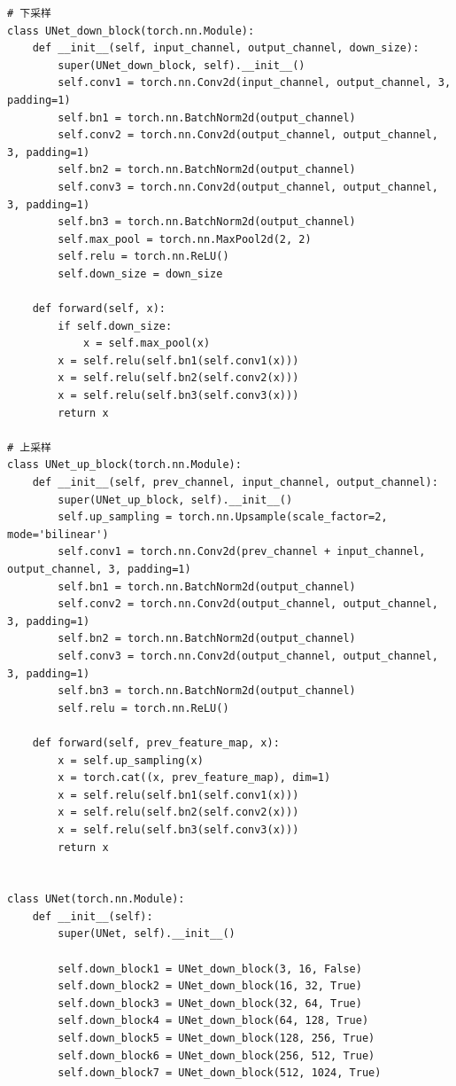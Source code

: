 \begin{lstlisting}
# 下采样
class UNet_down_block(torch.nn.Module):
    def __init__(self, input_channel, output_channel, down_size):
        super(UNet_down_block, self).__init__()
        self.conv1 = torch.nn.Conv2d(input_channel, output_channel, 3, padding=1)
        self.bn1 = torch.nn.BatchNorm2d(output_channel)
        self.conv2 = torch.nn.Conv2d(output_channel, output_channel, 3, padding=1)
        self.bn2 = torch.nn.BatchNorm2d(output_channel)
        self.conv3 = torch.nn.Conv2d(output_channel, output_channel, 3, padding=1)
        self.bn3 = torch.nn.BatchNorm2d(output_channel)
        self.max_pool = torch.nn.MaxPool2d(2, 2)
        self.relu = torch.nn.ReLU()
        self.down_size = down_size

    def forward(self, x):
        if self.down_size:
            x = self.max_pool(x)
        x = self.relu(self.bn1(self.conv1(x)))
        x = self.relu(self.bn2(self.conv2(x)))
        x = self.relu(self.bn3(self.conv3(x)))
        return x

# 上采样
class UNet_up_block(torch.nn.Module):
    def __init__(self, prev_channel, input_channel, output_channel):
        super(UNet_up_block, self).__init__()
        self.up_sampling = torch.nn.Upsample(scale_factor=2, mode='bilinear')
        self.conv1 = torch.nn.Conv2d(prev_channel + input_channel, output_channel, 3, padding=1)
        self.bn1 = torch.nn.BatchNorm2d(output_channel)
        self.conv2 = torch.nn.Conv2d(output_channel, output_channel, 3, padding=1)
        self.bn2 = torch.nn.BatchNorm2d(output_channel)
        self.conv3 = torch.nn.Conv2d(output_channel, output_channel, 3, padding=1)
        self.bn3 = torch.nn.BatchNorm2d(output_channel)
        self.relu = torch.nn.ReLU()

    def forward(self, prev_feature_map, x):
        x = self.up_sampling(x)
        x = torch.cat((x, prev_feature_map), dim=1)
        x = self.relu(self.bn1(self.conv1(x)))
        x = self.relu(self.bn2(self.conv2(x)))
        x = self.relu(self.bn3(self.conv3(x)))
        return x


class UNet(torch.nn.Module):
    def __init__(self):
        super(UNet, self).__init__()

        self.down_block1 = UNet_down_block(3, 16, False)
        self.down_block2 = UNet_down_block(16, 32, True)
        self.down_block3 = UNet_down_block(32, 64, True)
        self.down_block4 = UNet_down_block(64, 128, True)
        self.down_block5 = UNet_down_block(128, 256, True)
        self.down_block6 = UNet_down_block(256, 512, True)
        self.down_block7 = UNet_down_block(512, 1024, True)


\end{lstlisting}
